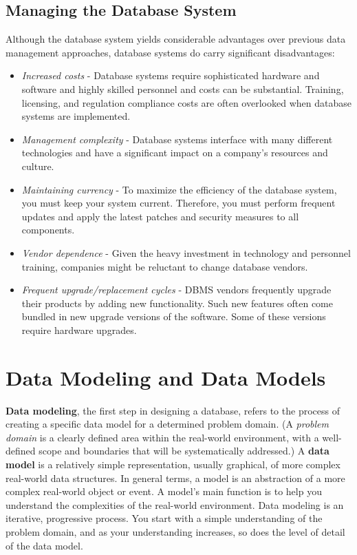 \documentclass[a4paper, 12pt, titlepage]{report}
\begin{document}
\subsection{Managing the Database System}
Although the database system yields considerable advantages over previous data management approaches, database systems do carry significant disadvantages:
\begin{itemize}
\item \emph{Increased costs} - Database systems require sophisticated hardware and software and highly skilled personnel and costs can be substantial. Training, licensing, and regulation compliance costs are often overlooked when database systems are implemented.
\item \emph{Management complexity} - Database systems interface with many different technologies and have a significant impact on a company’s resources and culture.
\item \emph{Maintaining currency} - To maximize the efficiency of the database system, you must keep your system current. Therefore, you must perform frequent updates and apply
the latest patches and security measures to all components.
\item \emph{Vendor dependence} - Given the heavy investment in technology and personnel training, companies might be reluctant to change database vendors.
\item \emph{Frequent upgrade/replacement cycles} - DBMS vendors frequently upgrade their products by adding new functionality. Such new features often come bundled in new upgrade versions of the software. Some of these versions require hardware upgrades.
\end{itemize}
\section{Data Modeling and Data Models}
\textbf{Data modeling}, the first step in designing a database, refers to the process of creating a specific data model for a determined problem domain. (A \emph{problem domain} is a clearly defined area within the real-world environment, with a well-defined scope and boundaries that will be systematically addressed.) A \textbf{data model} is a relatively simple representation, usually graphical, of more complex real-world data structures. In general terms, a model is an abstraction of a more complex real-world object or event. A model’s main function is to help you understand the complexities of the real-world environment. Data modeling is an iterative, progressive process. You start with a simple understanding of the problem domain, and as your understanding increases, so does the level of detail of the data model.
\end{document}

